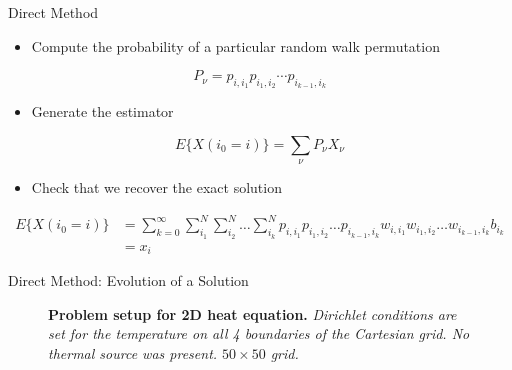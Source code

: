 \documentclass{beamer}
\begin{document}
\begin{frame}{Direct Method}

  \begin{itemize}
  \item Compute the probability of a particular random walk
    permutation
  \end{itemize}

  \[
  P_{\nu} = p_{i,i_1} p_{i_1,i_2} \cdots p_{i_{k-1},i_k}
  \]

  \begin{itemize}
  \item Generate the estimator
  \end{itemize}

  \[
  E\{X(i_0 = i)\} = \sum_{\nu} P_{\nu} X_{\nu}
  \]

  \begin{itemize}
  \item Check that we recover the exact solution
  \end{itemize}

  \[
  \begin{split}
    E\{X(i_0 = i)\}
    &=\sum_{k=0}^{\infty}\sum_{i_1}^{N}\sum_{i_2}^{N}\ldots
    \sum_{i_k}^{N} p_{i,i_1}p_{i_1,i_2}\ldots p_{i_{k-1},i_k}
    w_{i,i_1}w_{i_1,i_2}\ldots w_{i_{k-1},i_k} b_{i_k}\\ &= x_i
  \end{split}
  \]

\end{frame}

\begin{frame}{Direct Method: Evolution of a Solution}

  \begin{figure}[h!]
    \begin{center}
      \scalebox{1.0}{  }
    \end{center}
  \caption{\textbf{Problem setup for 2D heat equation.}
    \textit{Dirichlet conditions are set for the temperature on all 4
      boundaries of the Cartesian grid. No thermal source was
      present. $50 \times 50$ grid.}}
  \end{figure}

\end{frame}
\end{document}
